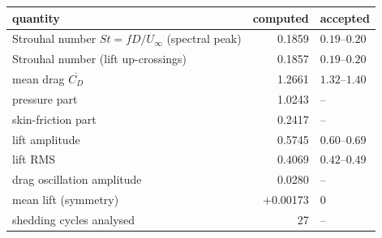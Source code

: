 \small
\begin{tabular}{lrl}
\toprule
quantity & computed & accepted\\
\midrule
Strouhal number $St=fD/U_\infty$ (spectral peak) & 0.1859 & $0.19$--$0.20$\\
Strouhal number (lift up-crossings) & 0.1857 & $0.19$--$0.20$\\
mean drag $\overline{C_D}$ & 1.2661 & $1.32$--$1.40$\\
\quad pressure part & 1.0243 & --\\
\quad skin-friction part & 0.2417 & --\\
lift amplitude & 0.5745 & $0.60$--$0.69$\\
lift RMS & 0.4069 & $0.42$--$0.49$\\
drag oscillation amplitude & 0.0280 & --\\
mean lift (symmetry) & +0.00173 & $0$\\
shedding cycles analysed & 27 & --\\
\bottomrule
\end{tabular}
